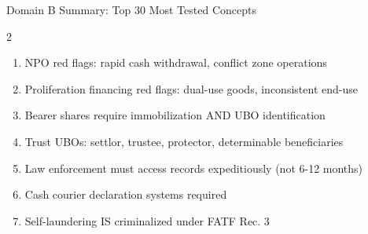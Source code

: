 \documentclass[11pt,a4paper]{beamer}
\begin{document}
\begin{frame}{Domain B Summary: Top 30 Most Tested Concepts}
\begin{multicols}{2}
\begin{enumerate}
				\item NPO red flags: rapid cash withdrawal, conflict zone operations
				\item Proliferation financing red flags: dual-use goods, inconsistent end-use
				\item Bearer shares require immobilization AND UBO identification
				\item Trust UBOs: settlor, trustee, protector, determinable beneficiaries
				\item Law enforcement must access records expeditiously (not 6-12 months)
				\item Cash courier declaration systems required
				\item Self-laundering IS criminalized under FATF Rec. 3
			\end{enumerate}
		\end{multicols}
	\end{frame}
	
\end{document}
